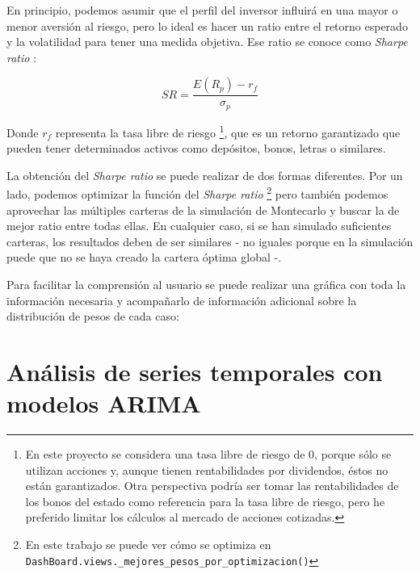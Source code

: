En principio, podemos asumir que el perfil del inversor influirá en una mayor o menor aversión al riesgo, pero lo ideal es hacer un ratio entre el retorno esperado y la volatilidad para tener una medida objetiva. Ese ratio se conoce como \emph{Sharpe ratio} \citep{wiki:sharpe_ratio}:

\begin{equation}
	SR = \frac{E(R_{p}) - r_{f}}{\sigma_{p}}
\end{equation}

Donde $r_{f}$ representa la tasa libre de riesgo \footnote{En este proyecto se considera una tasa libre de riesgo de 0, porque sólo se utilizan acciones y, aunque tienen rentabilidades por dividendos, éstos no están garantizados. Otra perspectiva podría ser tomar las rentabilidades de los bonos del estado como referencia para la tasa libre de riesgo, pero he preferido limitar los cálculos al mercado de acciones cotizadas.}, que es un retorno garantizado que pueden tener determinados activos como depósitos, bonos, letras o similares. 

La obtención del \emph{Sharpe ratio} se puede realizar de dos formas diferentes. Por un lado, podemos optimizar la función del \emph{Sharpe ratio} \footnote{En este trabajo se puede ver cómo se optimiza en \texttt{DashBoard.views.\_mejores\_pesos\_por\_optimizacion()}} pero también podemos aprovechar las múltiples carteras de la simulación de Montecarlo y buscar la de mejor ratio entre todas ellas. En cualquier caso, si se han simulado suficientes carteras, los resultados deben de ser similares - no iguales porque en la simulación puede que no se haya creado la cartera óptima global -. 

Para facilitar la comprensión al usuario se puede realizar una gráfica con toda la información necesaria y acompañarlo de información adicional sobre la distribución de pesos de cada caso:




\section{Análisis de series temporales con modelos ARIMA}\label{series_temporales_arima}

